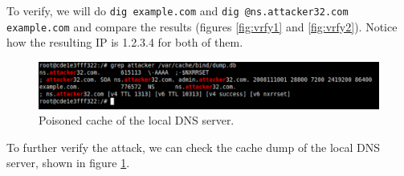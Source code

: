 \documentclass[12pt,reqno]{amsart}
\newcommand{\code}[1]{\texttt{#1}}
\begin{document}
To verify, we will do \code{dig example.com} and \code{dig @ns.attacker32.com example.com} and compare the results (figures \ref{fig:vrfy1} and \ref{fig:vrfy2}). Notice how the resulting IP is 1.2.3.4 for both of them.

\begin{figure}[h]
  \includegraphics[width=\linewidth]{img/LOCAL_POISONED.png}
  \caption{Poisoned cache of the local DNS server.}
  \label{fig:pois}
\end{figure}

To further verify the attack, we can check the cache dump of the local DNS server, shown in figure \ref{fig:pois}.
\end{document}

